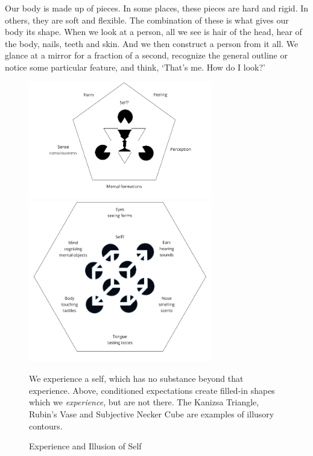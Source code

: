 Our body is made up of pieces. In some places, these pieces are hard and
rigid. In others, they are soft and flexible. The combination of these
is what gives our body its shape. When we look at a person, all we see
is hair of the head, hear of the body, nails, teeth and skin. And we
then construct a person from it all. We glance at a mirror for a
fraction of a second, recognize the general outline or notice some
particular feature, and think, `That's me. How do I look?'

\clearpage
\figurepagelayout

\begin{figure}[h]
\caption{Experience and Illusion of Self}\label{fig-illusion-of-self}

\centering

\includegraphics[width=80mm]{./manuscript/tex/diagrams/khandhas-self-illusion.pdf}

\bigskip

\includegraphics[width=80mm]{./manuscript/tex/diagrams/senses-self-illusion.pdf}

\bigskip

\begin{minipage}{0.8\linewidth}
\centering\footnotesize
We experience a self, which has no substance beyond that experience.
Above, conditioned expectations create filled-in shapes which we \emph{experience}, but are not there.
The Kanizsa Triangle, Rubin's Vase and Subjective Necker Cube are examples of illusory contours.
\end{minipage}

\end{figure}


